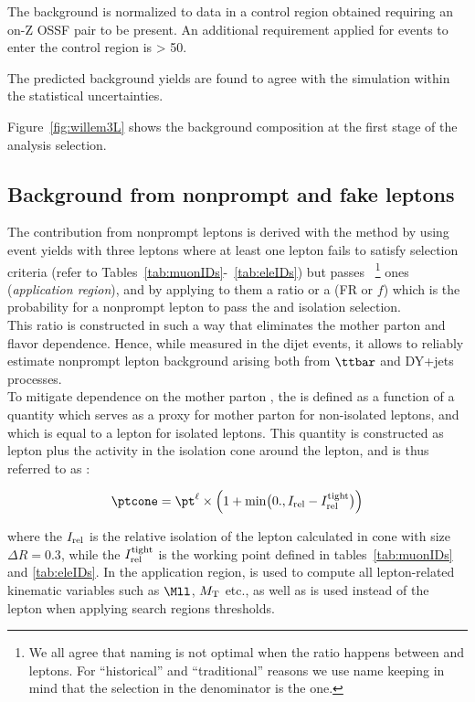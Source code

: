 The \WZ background is normalized to data in a control region obtained 
requiring an on-Z OSSF pair to be present. An additional requirement applied 
for events to enter the control region is \ptmiss > 50\GeV.

The predicted background yields are found to agree with the simulation
within the statistical uncertainties. 

Figure~\ref{fig:willem3L} shows the background composition at the
first stage of the analysis selection.


\subsection{Background from nonprompt and fake leptons}\label{sec:tight_loose_method}

The contribution from nonprompt leptons is derived with the \ttol method
by using event yields with three leptons where at least one lepton fails to satisfy \ti 
selection criteria (refer to
Tables~\ref{tab:muonIDs}-~\ref{tab:eleIDs}) but passes
\fo~\footnote{We all agree that \ttol naming is not optimal when the
  ratio happens between \ti and \fo leptons. For ``historical'' and ``traditional''
  reasons we use \ttol name keeping in mind that the selection in the
  denominator is the \fo one.}
ones (\emph{application region}), 
and by applying to them a \ttol ratio or a \fr (FR
or $f$) which is the probability for 
a nonprompt lepton to pass the \ti and isolation selection.\\
This ratio is constructed in such a way that eliminates the mother parton \pt and flavor dependence.
Hence, while measured in the dijet events, it allows to reliably estimate nonprompt lepton background
arising both from $\ttbar$ and DY+jets processes. \\
To mitigate \fr dependence on the mother parton \pt, the \fr is defined as a function
of a quantity which serves as a proxy for mother parton \pt for non-isolated leptons, and which
is equal to a lepton \pt for isolated leptons. This quantity is
constructed as lepton \pt plus 
the activity in the isolation cone around the lepton, and is thus referred to as \ptcone:

\begin{equation}
\ptcone = \pt^\ell\times\Bigl(1+ \min\bigl(0., \Irel - \Irel^\text{tight}\bigr) \Bigr)
\end{equation}

\noindent where the $I_{\mathrm{rel}}$ is the relative isolation of the lepton
calculated in cone with size $\Delta R=0.3$, while the
$I_{\mathrm{rel}}^\text{tight}$ is the \ti  working point defined in tables~\ref{tab:muonIDs} and \ref{tab:eleIDs}.
In the application region, \ptcone is used to compute all lepton-related kinematic variables
such as $\Mll$, $M_{\mathrm{T}}$ etc., as well as is used instead of the lepton \pt when applying 
search regions \pt thresholds.

